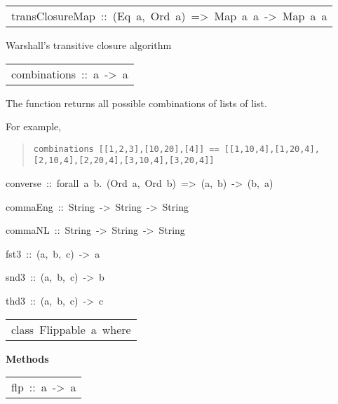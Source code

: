 \begin{haddockdesc}
\item[\begin{tabular}{@{}l}
transClosureMap\ ::\ (Eq\ a,\ Ord\ a)\ =>\ Map\ a\ {\char 91}a{\char 93}\ ->\ Map\ a\ {\char 91}a{\char 93}
\end{tabular}]\haddockbegindoc
Warshall's transitive closure algorithm
\par

\end{haddockdesc}
\begin{haddockdesc}
\item[\begin{tabular}{@{}l}
combinations\ ::\ {\char 91}{\char 91}a{\char 93}{\char 93}\ ->\ {\char 91}{\char 91}a{\char 93}{\char 93}
\end{tabular}]\haddockbegindoc
The  function returns all possible combinations of lists of list.

 For example,
\par
\begin{quote}
{\haddockverb\begin{verbatim}
combinations [[1,2,3],[10,20],[4]] == [[1,10,4],[1,20,4],[2,10,4],[2,20,4],[3,10,4],[3,20,4]]
\end{verbatim}}
\end{quote}

\end{haddockdesc}
\begin{haddockdesc}
\item[
converse\ ::\ forall\ a\ b.\ (Ord\ a,\ Ord\ b)\ =>\ {\char 91}(a,\ {\char 91}b{\char 93}){\char 93}\ ->\ {\char 91}(b,\ {\char 91}a{\char 93}){\char 93}
]
\item[
commaEng\ ::\ String\ ->\ {\char 91}String{\char 93}\ ->\ String
]
\item[
commaNL\ ::\ String\ ->\ {\char 91}String{\char 93}\ ->\ String
]
\item[
fst3\ ::\ (a,\ b,\ c)\ ->\ a
]
\item[
snd3\ ::\ (a,\ b,\ c)\ ->\ b
]
\item[
thd3\ ::\ (a,\ b,\ c)\ ->\ c
]
\end{haddockdesc}
\begin{haddockdesc}
\item[\begin{tabular}{@{}l}
class\ Flippable\ a\ where
\end{tabular}]\haddockbegindoc
\haddockpremethods{}\textbf{Methods}
\begin{haddockdesc}
\item[\begin{tabular}{@{}l}
flp\ ::\ a\ ->\ a
\end{tabular}]
\end{haddockdesc}
\end{haddockdesc}
